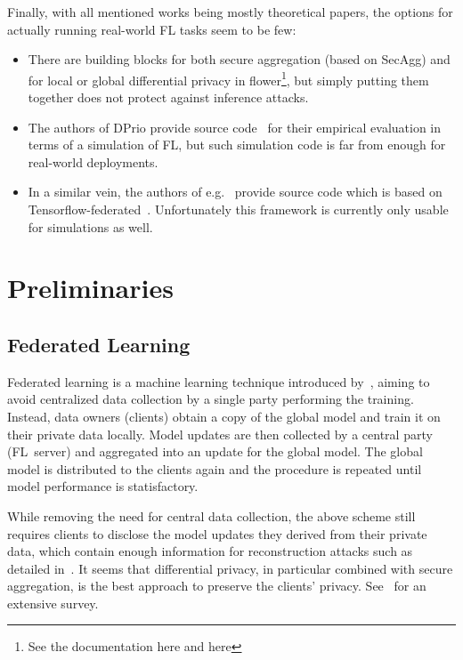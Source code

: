 \documentclass{article}
\begin{document}
Finally, with all mentioned works being mostly theoretical papers, the
options for actually running real-world FL tasks seem to be few:
\begin{itemize}
  \setlength\itemsep{0em}
\item There are building blocks for both secure aggregation (based on SecAgg) and for local or
  global differential privacy in flower\footnote{See the documentation here and
    here}, but simply putting them together does not protect against inference
  attacks.
\item The authors of DPrio provide source code~\cite{} for their empirical evaluation in
  terms of a simulation of FL, but such simulation code is far from enough for
  real-world deployments.
\item In a similar vein, the authors of e.g.~\cite{Kairouz2021TheDD} provide
  source code which is based on Tensorflow-federated~\cite{}. Unfortunately this
  framework is currently only usable for simulations as well.
\end{itemize}



\section{Preliminaries}

\subsection{Federated Learning}
Federated learning is a machine learning technique introduced
by~\citet{FL}, aiming to avoid centralized data collection by a single
party performing the training. Instead, data owners (clients) obtain a copy of
the global model and train it on their private data locally. Model updates are
then collected by a central party (FL~server) and aggregated into an update for
the global model. The global model is distributed to the clients again and the
procedure is repeated until model performance is statisfactory.

While removing the need for central data collection, the above scheme still
requires clients to disclose the model updates they derived from their private
data, which contain enough information for reconstruction attacks such as
detailed in~\cite{7958568,Boenisch2021WhenTC}. It seems that differential
privacy, in particular combined with secure aggregation, is the best approach to
preserve the clients' privacy. See~\cite{fl-survey} for an extensive survey.
\end{document}
